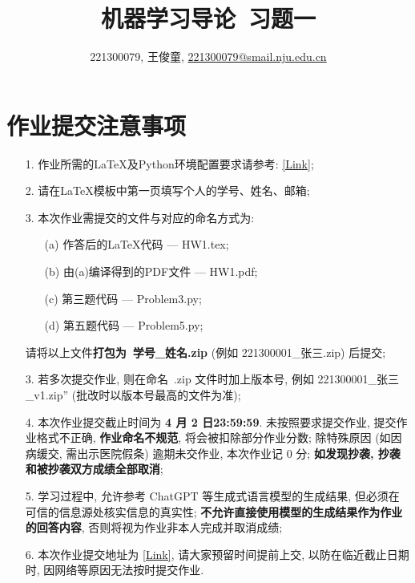 \documentclass[a4paper,UTF8]{article}
\numberwithin{equation}{section}
\theoremstyle{definition}
\begin{document}
\title{机器学习导论\ 习题一}
\author{221300079, 王俊童, \href{mailto:221300079@smail.nju.edu.cn}{221300079@smail.nju.edu.cn}}
\maketitle
\section*{作业提交注意事项}
\begin{tcolorbox}
    \begin{enumerate}
        \item[1.] 作业所需的LaTeX及Python环境配置要求请参考: \href{https://www.lamda.nju.edu.cn/ML2024Spring/supplemantary/environment.pdf}{[Link]};
        \item[2.] 请在LaTeX模板中第一页填写个人的学号、姓名、邮箱;
        \item[3.] 本次作业需提交的文件与对应的命名方式为:
            \begin{enumerate}
                \item [(a)] 作答后的LaTeX代码 --- HW1.tex;
                \item [(b)] 由(a)编译得到的PDF文件 --- HW1.pdf;
                \item [(c)] 第三题代码 --- Problem3.py;
                \item [(d)] 第五题代码 --- Problem5.py;
            \end{enumerate}
            请将以上文件{\color{red}\textbf{打包为~学号\_姓名.zip}} (例如 221300001\_张三.zip) 后提交;
        \item[3.] 若多次提交作业, 则在命名~.zip 文件时加上版本号, 例如 221300001\_张三\_v1.zip” (批改时以版本号最高的文件为准);
        \item[4.] 本次作业提交截止时间为 {\color{red}\textbf{ 4 月 2 日23:59:59}}. 未按照要求提交作业, 提交作业格式不正确, {\color{red}\textbf{作业命名不规范}}, 将会被扣除部分作业分数; 除特殊原因 (如因病缓交, 需出示医院假条) 逾期未交作业, 本次作业记 0 分; {\color{red}\textbf{如发现抄袭, 抄袭和被抄袭双方成绩全部取消}};
        \item[5.] 学习过程中, 允许参考 ChatGPT 等生成式语言模型的生成结果, 但必须在可信的信息源处核实信息的真实性; {\color{red}\textbf{不允许直接使用模型的生成结果作为作业的回答内容}}, 否则将视为作业非本人完成并取消成绩;
        \item[6.] 本次作业提交地址为 \href{https://box.nju.edu.cn/u/d/d6a0c7575dc34a7d8e62/}{[Link]}, 请大家预留时间提前上交, 以防在临近截止日期时, 因网络等原因无法按时提交作业.
    \end{enumerate}
\end{tcolorbox}
\newpage
\end{document}

